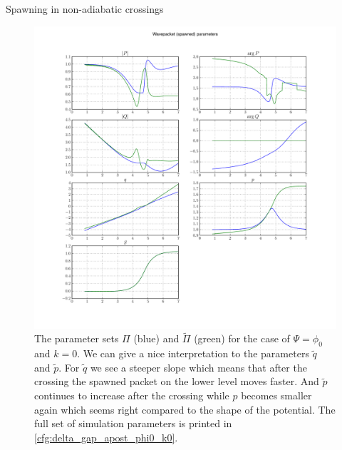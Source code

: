 \begin{chapter}{Spawning in non-adiabatic crossings}
\begin{figure}
  \centering
  \includegraphics[width=\the\linewidth]{./figures/delta_gap_spawn_phi0_k0/wavepacket_parameters_abs_ang_spawned.pdf}
  \caption[The parameter sets $\Pi$ (blue) and $\tilde{\Pi}$ (green) for the case of
  $\Psi = \phi_0$ and $k=0$]{The parameter sets $\Pi$ (blue) and $\tilde{\Pi}$ (green) for the case of
  $\Psi = \phi_0$ and $k=0$. We can give a nice interpretation to the parameters
  $\tilde{q}$ and $\tilde{p}$. For $\tilde{q}$ we see a steeper slope which means
  that after the crossing the spawned packet on the lower level moves faster. And
  $\tilde{p}$ continues to increase after the crossing while $p$ becomes smaller
  again which seems right compared to the shape of the potential.
  The full set of simulation parameters is printed in \ref{cfg:delta_gap_apost_phi0_k0}.
  }
  \label{fig:avoided_crossing_parameters}
\end{figure}



\end{chapter}
